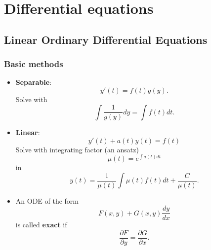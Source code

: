 \chapter{Differential equations}

\section{Linear Ordinary Differential Equations}

\subsection{Basic methods}

\begin{itemize}
    \item \textbf{Separable}:
        $$ y'(t) = f(t) g(y) . $$
    Solve with
        $$ \int \frac{1}{g(y)} dy = \int f(t) dt . $$
    \item \textbf{Linear}:
        $$ y'(t) + a(t) y(t) = f(t) $$
    Solve with integrating factor (an ansatz)
        $$ \mu(t) = e^{\int a(t) dt} $$
    in
        $$ y(t) = \frac{1}{\mu(t)} \int \mu(t) f(t) dt
            + \frac{C}{\mu(t)} . $$
    \item An ODE of the form
        $$ F(x, y) + G(x, y) \frac{dy}{dx} $$
    is called \textbf{exact} if
        $$ \frac{\partial F}{\partial y}
            = \frac{\partial G}{\partial x} . $$
\end{itemize}

\newpage

